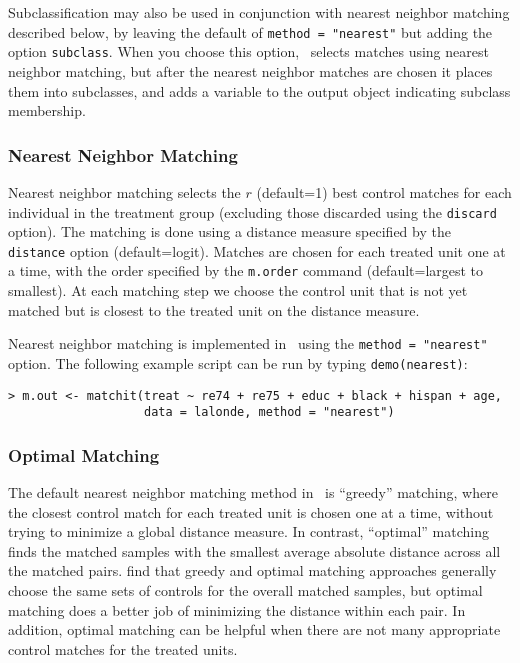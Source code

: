 Subclassification may also be used in conjunction with nearest
neighbor matching described below, by leaving the default of
\texttt{method = "nearest"} but adding the option \texttt{subclass}.
When you choose this option, \MatchIt\ selects matches using nearest neighbor
matching, but
after the nearest neighbor matches are chosen it places them into
subclasses, and adds a variable to the output object indicating subclass membership.


\subsubsection{Nearest Neighbor Matching}
\label{subsubsec:nearest}

Nearest neighbor matching selects the $r$ (default=1) best control
matches for each individual in the treatment group (excluding those
discarded using the \texttt{discard} option).  The matching is done
using a distance measure specified by the {\tt distance} option
(default=logit).  Matches are chosen for each treated unit one at a
time, with the order specified by the \texttt{m.order} command (default=largest to smallest).  
At each matching step we choose the control unit that is not
yet matched but is closest to the treated unit on the distance
measure.

Nearest neighbor matching is implemented in \MatchIt\ using the
\texttt{method = "nearest"} option.  The following example script can
be run by typing {\tt demo(nearest)}:
\begin{verbatim}
> m.out <- matchit(treat ~ re74 + re75 + educ + black + hispan + age, 
                   data = lalonde, method = "nearest")
\end{verbatim}

\subsubsection{Optimal Matching}
\label{subsubsec:optimal}

The default nearest neighbor matching method in \MatchIt\ is
``greedy'' matching, where the closest control match for each treated
unit is chosen one at a time, without trying to minimize a global
distance measure.  In contrast, ``optimal'' matching finds the matched
samples with the smallest average absolute distance across all the
matched pairs.  \citet{GuRos93} find that greedy and optimal matching
approaches generally choose the same sets of controls for the overall
matched samples, but optimal matching does a better job of minimizing
the distance within each pair.  In addition, optimal matching can be
helpful when there are not many appropriate control matches for the
treated units.

